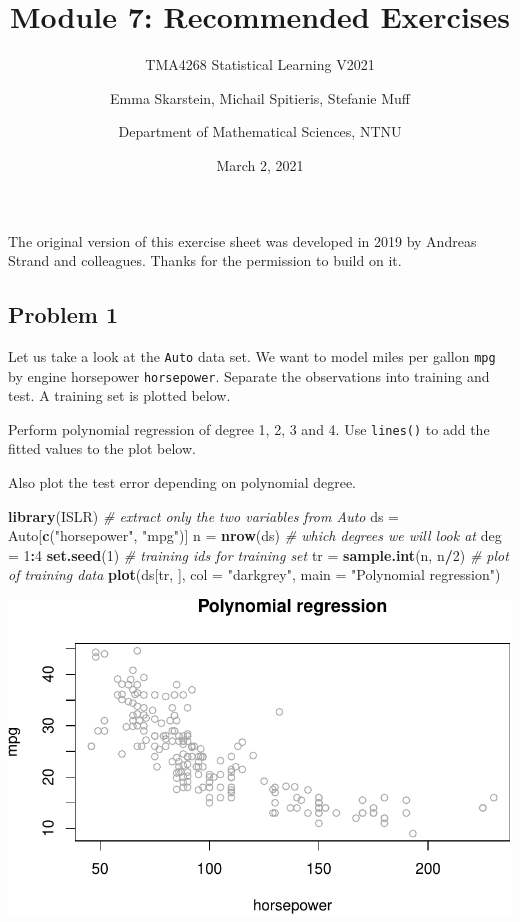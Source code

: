 \documentclass[]{article}
\title{Module 7: Recommended Exercises}
\subtitle{TMA4268 Statistical Learning V2021}
\author{Emma Skarstein, Michail Spitieris, Stefanie Muff \and Department of Mathematical Sciences, NTNU}
\date{March 2, 2021}
\newenvironment{Shaded}{\begin{snugshade}}{\end{snugshade}}
\newcommand{\CommentTok}[1]{\textcolor[rgb]{0.56,0.35,0.01}{\textit{#1}}}
\newcommand{\DataTypeTok}[1]{\textcolor[rgb]{0.13,0.29,0.53}{#1}}
\newcommand{\DecValTok}[1]{\textcolor[rgb]{0.00,0.00,0.81}{#1}}
\newcommand{\KeywordTok}[1]{\textcolor[rgb]{0.13,0.29,0.53}{\textbf{#1}}}
\newcommand{\NormalTok}[1]{#1}
\newcommand{\OperatorTok}[1]{\textcolor[rgb]{0.81,0.36,0.00}{\textbf{#1}}}
\newcommand{\StringTok}[1]{\textcolor[rgb]{0.31,0.60,0.02}{#1}}
\begin{document}
\maketitle

The original version of this exercise sheet was developed in 2019 by
Andreas Strand and colleagues. Thanks for the permission to build on it.

\hypertarget{problem-1}{%
\subsection{Problem 1}\label{problem-1}}

Let us take a look at the \texttt{Auto} data set. We want to model miles
per gallon \texttt{mpg} by engine horsepower \texttt{horsepower}.
Separate the observations into training and test. A training set is
plotted below.

Perform polynomial regression of degree 1, 2, 3 and 4. Use
\texttt{lines()} to add the fitted values to the plot below.

Also plot the test error depending on polynomial degree.

\begin{Shaded}
\begin{Highlighting}[]
\KeywordTok{library}\NormalTok{(ISLR)}
\CommentTok{# extract only the two variables from Auto}
\NormalTok{ds =}\StringTok{ }\NormalTok{Auto[}\KeywordTok{c}\NormalTok{(}\StringTok{"horsepower"}\NormalTok{, }\StringTok{"mpg"}\NormalTok{)]}
\NormalTok{n =}\StringTok{ }\KeywordTok{nrow}\NormalTok{(ds)}
\CommentTok{# which degrees we will look at}
\NormalTok{deg =}\StringTok{ }\DecValTok{1}\OperatorTok{:}\DecValTok{4}
\KeywordTok{set.seed}\NormalTok{(}\DecValTok{1}\NormalTok{)}
\CommentTok{# training ids for training set}
\NormalTok{tr =}\StringTok{ }\KeywordTok{sample.int}\NormalTok{(n, n}\OperatorTok{/}\DecValTok{2}\NormalTok{)}
\CommentTok{# plot of training data}
\KeywordTok{plot}\NormalTok{(ds[tr, ], }\DataTypeTok{col =} \StringTok{"darkgrey"}\NormalTok{, }\DataTypeTok{main =} \StringTok{"Polynomial regression"}\NormalTok{)}
\end{Highlighting}
\end{Shaded}

\includegraphics{RecEx7_files/figure-latex/unnamed-chunk-1-1.pdf}
\end{document}
